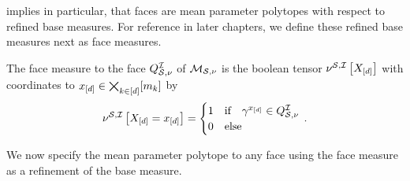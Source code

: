  implies in particular, that faces are mean parameter polytopes with respect to refined base measures.
For reference in later chapters, we define these refined base measures next as face measures.

\begin{definition}
    \label{def:faceMeasure}
    The face measure to the face $Q^{\mathcal{I}}_{\mathcal{S},\nu}$ of $\mathcal{M}_{\mathcal{S},\nu}$ is the boolean tensor $\nu^{\mathcal{S},\mathcal{I}}\left[X_{[d]}\right]$ with coordinates to $x_{[d]}\in\bigtimes_{k\in[d]}[m_{k}]$ by
    \begin{align*}
        \nu^{\mathcal{S},\mathcal{I}}\left[X_{[d]}=x_{[d]}\right]
        = \begin{cases}
              1 & \text{if} \quad \gamma^{x_{[d]}}\in Q^{\mathcal{I}}_{\mathcal{S},\nu} \\
              0 & \text{else}
        \end{cases} \, .
    \end{align*}
\end{definition}

We now specify the mean parameter polytope to any face using the face measure as a refinement of the base measure.

